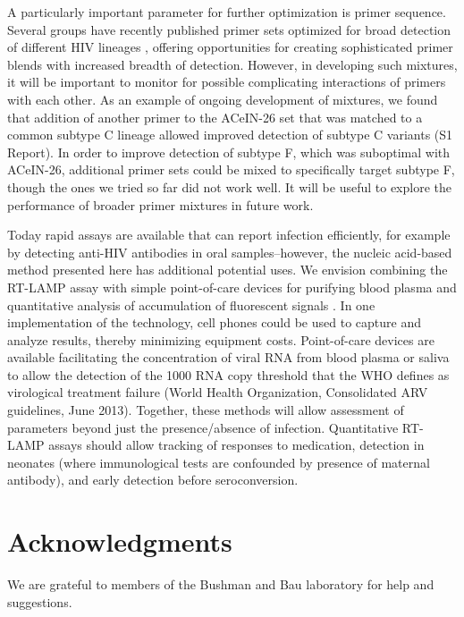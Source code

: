 \documentclass[../sherrill-Mix_thesis.tex]{subfiles}
\begin{document}
	A particularly important parameter for further optimization is primer sequence. Several groups have recently published primer sets optimized for broad detection of different HIV lineages \citep{Zeng2014,Hosaka2009}, offering opportunities for creating sophisticated primer blends with increased breadth of detection. However, in developing such mixtures, it will be important to monitor for possible complicating interactions of primers with each other. As an example of ongoing development of mixtures, we found that addition of another primer to the ACeIN-26 set that was matched to a common subtype C lineage allowed improved detection of subtype C variants (S1 Report). In order to improve detection of subtype F, which was suboptimal with ACeIN-26, additional primer sets could be mixed to specifically target subtype F, though the ones we tried so far did not work well. It will be useful to explore the performance of broader primer mixtures in future work.

	Today rapid assays are available that can report infection efficiently, for example by detecting anti-HIV antibodies in oral samples--however, the nucleic acid-based method presented here has additional potential uses. We envision combining the RT-LAMP assay with simple point-of-care devices for purifying blood plasma \citep{Liu2013} and quantitative analysis of accumulation of fluorescent signals \citep{Liu2011}. In one implementation of the technology, cell phones could be used to capture and analyze results, thereby minimizing equipment costs. Point-of-care devices are available facilitating the concentration of viral RNA from blood plasma or saliva \citep{Liu2011} to allow the detection of the 1000 RNA copy threshold that the WHO defines as virological treatment failure (World Health Organization, Consolidated ARV guidelines, June 2013). Together, these methods will allow assessment of parameters beyond just the presence/absence of infection. Quantitative RT-LAMP assays should allow tracking of responses to medication, detection in neonates (where immunological tests are confounded by presence of maternal antibody), and early detection before seroconversion.

\section{Acknowledgments}
	We are grateful to members of the Bushman and Bau laboratory for help and suggestions.
\end{document}
